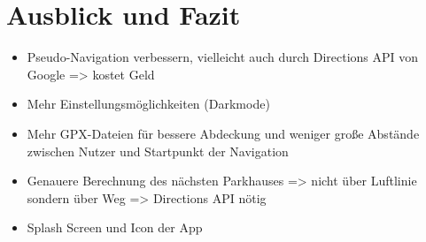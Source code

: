 \chapter{Ausblick und Fazit}
\label{chap:7}

\begin{itemize}
	\item Pseudo-Navigation verbessern, vielleicht auch durch Directions API von Google => kostet Geld
	\item Mehr Einstellungsmöglichkeiten (Darkmode)
	\item Mehr GPX-Dateien für bessere Abdeckung und weniger große Abstände zwischen Nutzer und Startpunkt der Navigation
	\item Genauere Berechnung des nächsten Parkhauses => nicht über Luftlinie sondern über Weg => Directions API nötig
	\item Splash Screen und Icon der App
\end{itemize}